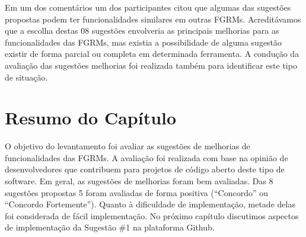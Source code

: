 Em um dos comentários um dos participantes citou que algumas das sugestões
propostas podem ter funcionalidades similares em outras FGRMs. Acreditávamos
que a escolha destas 08 sugestões envolveria as principais melhorias para as
funcionalidades das FGRMs, mas existia a possibilidade de alguma sugestão
existir de forma parcial ou completa em determinada ferramenta. A condução da
avaliação das sugestões melhorias foi realizada também para identificar este
tipo de situação.

\section{Resumo do Capítulo}\label{sec:sug_melhoria_resumo}

O objetivo do levantamento foi avaliar as sugestões de melhorias de
funcionalidades das FGRMs. A avaliação foi realizada com base na opinião de
desenvolvedores que contribuem para projetos de código aberto deste tipo de
software. Em geral, as sugestões de melhorias foram bem avaliadas. Das 8
sugestões propostas 5 foram avaliadas de forma positiva (``Concordo'' ou
``Concordo Fortemente''). Quanto à dificuldade de implementação, metade delas
foi considerada de fácil implementação. No próximo capítulo discutimos aspectos
de implementação da Sugestão \#1 na plataforma Github.
